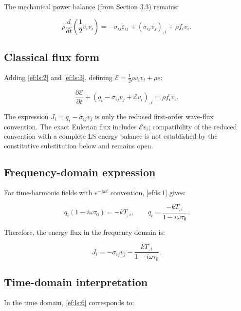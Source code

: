 The mechanical power balance (from Section 3.3) remains:

\begin{equation}
\rho \frac{d}{dt}\left(\frac{1}{2}v_i v_i\right)
= -\sigma_{ij}\dot{\varepsilon}_{ij} + (\sigma_{ij}v_j)_{,i} + \rho f_i v_i.
\label{ef:ls:3}
\end{equation}

\subsection{Classical flux form}

Adding \eqref{ef:ls:2} and \eqref{ef:ls:3}, defining $\mathcal{E} = \frac{1}{2}\rho v_i v_i + \rho e$:

\begin{equation}
\frac{\partial\mathcal{E}}{\partial t} + (q_i - \sigma_{ij}v_j + \mathcal{E}v_i)_{,i} = \rho f_i v_i.
\label{ef:ls:4}
\end{equation}

The expression $J_i=q_i-\sigma_{ij}v_j$ is only the reduced first-order wave-flux convention. The exact Eulerian flux includes $\mathcal{E}v_i$; compatibility of the reduced convention with a complete LS energy balance is not established by the constitutive substitution below and remains open.

\subsection{Frequency-domain expression}

For time-harmonic fields with $e^{-i\omega t}$ convention, \eqref{ef:ls:1} gives:

\begin{equation}
q_i(1 - i\omega\tau_0) = -k T_{,i},
\qquad
q_i = \frac{-k T_{,i}}{1 - i\omega\tau_0}.
\label{ef:ls:5}
\end{equation}

Therefore, the energy flux in the frequency domain is:

\begin{equation}
J_i = -\sigma_{ij}v_j - \frac{k T_{,i}}{1 - i\omega\tau_0}.
\label{ef:ls:6}
\end{equation}

\subsection{Time-domain interpretation}

In the time domain, \eqref{ef:ls:6} corresponds to:

